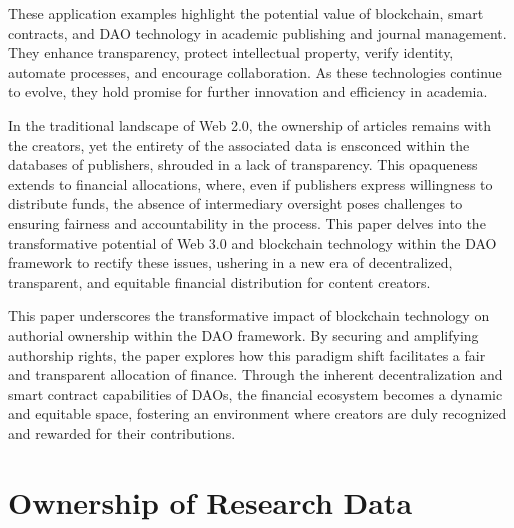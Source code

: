 \documentclass[lettersize,journal]{IEEEtran}
\begin{document}
These application examples highlight the potential value of blockchain, smart contracts, and DAO technology in academic publishing and journal management. They enhance transparency, protect intellectual property, verify identity, automate processes, and encourage collaboration. As these technologies continue to evolve, they hold promise for further innovation and efficiency in academia.

In the traditional landscape of Web 2.0, the ownership of articles remains with the creators, yet the entirety of the associated data is ensconced within the databases of publishers, shrouded in a lack of transparency. This opaqueness extends to financial allocations, where, even if publishers express willingness to distribute funds, the absence of intermediary oversight poses challenges to ensuring fairness and accountability in the process. This paper delves into the transformative potential of Web 3.0 and blockchain technology within the DAO framework to rectify these issues, ushering in a new era of decentralized, transparent, and equitable financial distribution for content creators.

This paper underscores the transformative impact of blockchain technology on authorial ownership within the DAO framework. By securing and amplifying authorship rights, the paper explores how this paradigm shift facilitates a fair and transparent allocation of finance. Through the inherent decentralization and smart contract capabilities of DAOs, the financial ecosystem becomes a dynamic and equitable space, fostering an environment where creators are duly recognized and rewarded for their contributions.

\section{Ownership of Research Data}
\end{document}
